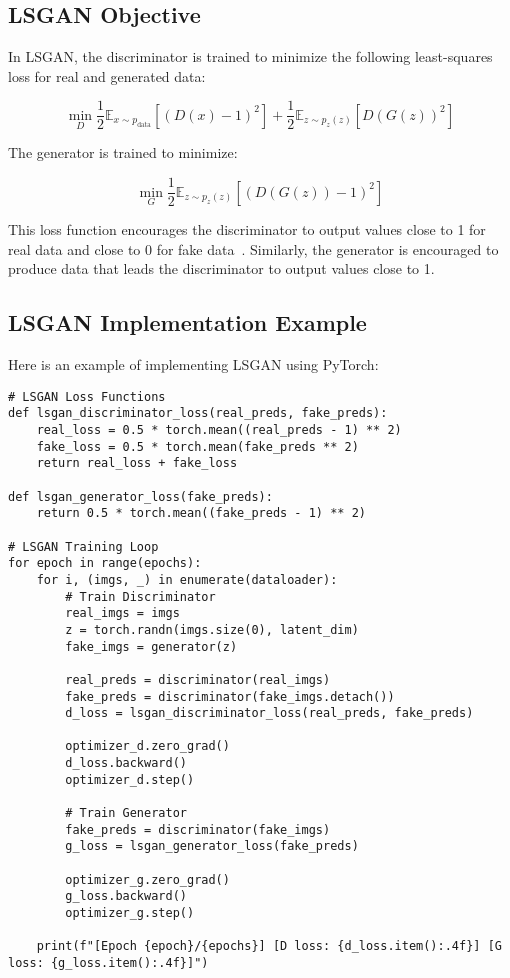 \subsection{LSGAN Objective}
In LSGAN, the discriminator is trained to minimize the following least-squares loss for real and generated data:

\[
\min_D \frac{1}{2} \mathbb{E}_{x \sim p_{\text{data}}} [(D(x) - 1)^2] + \frac{1}{2} \mathbb{E}_{z \sim p_z(z)} [D(G(z))^2]
\]

The generator is trained to minimize:

\[
\min_G \frac{1}{2} \mathbb{E}_{z \sim p_z(z)} [(D(G(z)) - 1)^2]
\]

This loss function encourages the discriminator to output values close to 1 for real data and close to 0 for fake data~\cite{lee2022least}. Similarly, the generator is encouraged to produce data that leads the discriminator to output values close to 1.

\subsection{LSGAN Implementation Example}
Here is an example of implementing LSGAN using PyTorch:

\begin{lstlisting}[style=python]
# LSGAN Loss Functions
def lsgan_discriminator_loss(real_preds, fake_preds):
    real_loss = 0.5 * torch.mean((real_preds - 1) ** 2)
    fake_loss = 0.5 * torch.mean(fake_preds ** 2)
    return real_loss + fake_loss

def lsgan_generator_loss(fake_preds):
    return 0.5 * torch.mean((fake_preds - 1) ** 2)

# LSGAN Training Loop
for epoch in range(epochs):
    for i, (imgs, _) in enumerate(dataloader):
        # Train Discriminator
        real_imgs = imgs
        z = torch.randn(imgs.size(0), latent_dim)
        fake_imgs = generator(z)
        
        real_preds = discriminator(real_imgs)
        fake_preds = discriminator(fake_imgs.detach())
        d_loss = lsgan_discriminator_loss(real_preds, fake_preds)

        optimizer_d.zero_grad()
        d_loss.backward()
        optimizer_d.step()

        # Train Generator
        fake_preds = discriminator(fake_imgs)
        g_loss = lsgan_generator_loss(fake_preds)

        optimizer_g.zero_grad()
        g_loss.backward()
        optimizer_g.step()

    print(f"[Epoch {epoch}/{epochs}] [D loss: {d_loss.item():.4f}] [G loss: {g_loss.item():.4f}]")
\end{lstlisting}

